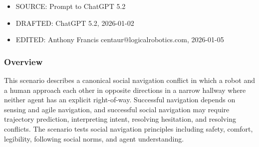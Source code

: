 \documentclass[utf8]{frontiers_suppmat} %
\providecommand{\tightlist}{%
  \setlength{\itemsep}{0pt}\setlength{\parskip}{0pt}}
\begin{document}
\begin{itemize}
\tightlist
\item
  SOURCE: Prompt to ChatGPT 5.2
\item
  DRAFTED: ChatGPT 5.2, 2026-01-02
\item
  EDITED: Anthony Francis centaur@logicalrobotics.com, 2026-01-05
\end{itemize}

\subsubsection{Overview}\label{overview}

This scenario describes a canonical social navigation conflict in which
a robot and a human approach each other in opposite directions in a
narrow hallway where neither agent has an explicit right-of-way.
Successful navigation depends on sensing and agile navigation, and
successful social navigation may require trajectory prediction,
interpreting intent, resolving hesitation, and resolving conflicts. The
scenario tests social navigation principles including safety, comfort,
legibility, following social norms, and agent understanding.
\end{document}
